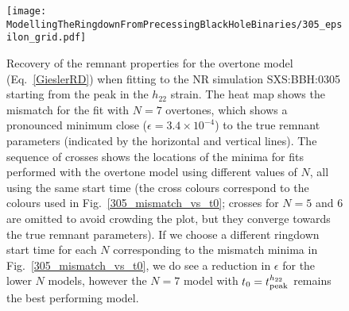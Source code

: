 \begin{figure}[t]
    \centering
    \texttt{[image: ModellingTheRingdownFromPrecessingBlackHoleBinaries/305\_epsilon\_grid.pdf]}
    \caption[Recovery of the SXS:BBH:0305 remnant properties using an overtone model starting from the peak of the $h_{22}$ strain]{ 
    Recovery of the remnant properties for the overtone model (Eq.~\ref{GieslerRD}) when fitting to the NR simulation SXS:BBH:0305 starting from the peak in the $h_{22}$ strain.
    The heat map shows the mismatch for the fit with $N=7$ overtones, which shows a pronounced minimum close ($\epsilon=3.4\times 10^{-4}$) to the true remnant parameters (indicated by the horizontal and vertical lines).
    The sequence of crosses shows the locations of the minima for fits performed with the overtone model using different values of $N$, all using the same start time (the cross colours correspond to the colours used in Fig.~\ref{305_mismatch_vs_t0}; crosses for $N=5$ and 6 are omitted to avoid crowding the plot, but they converge towards the true remnant parameters). 
    If we choose a different ringdown start time for each $N$ corresponding to the mismatch minima in Fig.~\ref{305_mismatch_vs_t0}, we do see a reduction in $\epsilon$ for the lower $N$ models, however the $N=7$ model with $t_0=t_{\rm peak}^{h_{22}}$ remains the best performing model.
    } 
    \label{305_epsilon_grid}
\end{figure}

